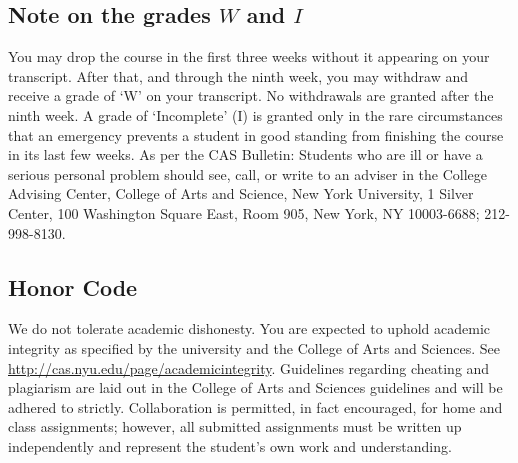 \documentclass[10pt]{article}
\theoremstyle{definition}
\begin{document}
\subsection*{Note on the grades $W$ and $I$}
You may drop the course in the first three weeks without it appearing on your transcript. After
that, and through the ninth week, you may withdraw and receive a grade of `W' on your transcript.
No withdrawals are granted after the ninth week.
A grade of `Incomplete' (I) is granted only in the rare circumstances that an emergency prevents
a student in good standing from finishing the course in its last few weeks. As per the CAS Bulletin:
Students who are ill or have a serious personal problem should see, call, or write to an
adviser in the College Advising Center, College of Arts and Science, New York University,
1 Silver Center, 100 Washington Square East, Room 905, New York, NY 10003-6688; 212-
998-8130.

\subsection*{Honor Code}

We do not tolerate academic dishonesty.  You are expected to uphold academic integrity as specified by the university and the College of Arts and Sciences.  See \url{http://cas.nyu.edu/page/academicintegrity}. Guidelines regarding cheating and plagiarism are laid out in the College of Arts and Sciences guidelines and will be adhered to strictly. Collaboration is permitted, in fact encouraged, for home and class assignments; however, all submitted assignments must be written up independently and represent the student’s own work and understanding.
\end{document}
